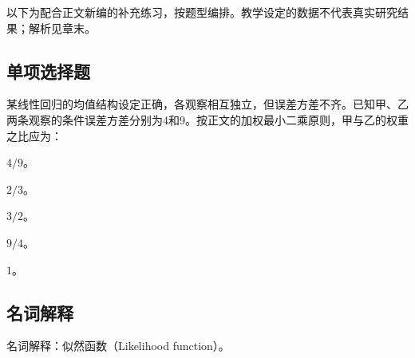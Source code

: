 \begin{keyidea}[说明]以下为配合正文新编的补充练习，按题型编排。教学设定的数据不代表真实研究结果；解析见章末。\end{keyidea}

\par\addvspace{8pt}\noindent\begin{minipage}{\linewidth}

\subsection{单项选择题}


某线性回归的均值结构设定正确，各观察相互独立，但误差方差不齐。已知甲、乙两条观察的条件误差方差分别为4和9。按正文的加权最小二乘原则，甲与乙的权重之比应为：

\begin{choices}

\item \(4/9\)。

\item \(2/3\)。

\item \(3/2\)。

\item \(9/4\)。

\item \(1\)。

\end{choices}

\end{minipage}\par\vspace{5pt}

\par\addvspace{8pt}\noindent\begin{minipage}{\linewidth}

\subsection{名词解释}


名词解释：似然函数（Likelihood function）。


\end{minipage}\par\vspace{5pt}

